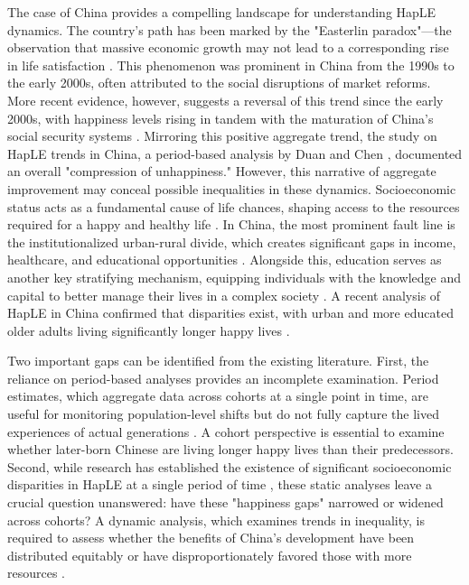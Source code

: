 \documentclass[12pt, a4paper]{article}
\begin{document}
The case of China provides a compelling landscape for understanding HapLE dynamics. The country's path has been marked by the "Easterlin paradox"—the observation that massive economic growth may not lead to a corresponding rise in life satisfaction \autocite{easterlin.1974.does}. This phenomenon was prominent in China from the 1990s to the early 2000s, often attributed to the social disruptions of market reforms\autocite{easterlin.2012.chinas,graham.2017.happiness,knight.2011.does}. More recent evidence, however, suggests a reversal of this trend since the early 2000s, with happiness levels rising in tandem with the maturation of China’s social security systems \autocite{cai.2023.does,wang.2023.hierarchical}. Mirroring this positive aggregate trend, the study on HapLE trends in China, a period-based analysis by Duan and Chen \autocite{duan.2020.happy}, documented an overall "compression of unhappiness." However, this narrative of aggregate improvement may conceal possible inequalities in these dynamics. Socioeconomic status acts as a fundamental cause of life chances, shaping access to the resources required for a happy and healthy life \autocite{link.1995.social}. In China, the most prominent fault line is the institutionalized urban-rural divide, which creates significant gaps in income, healthcare, and educational opportunities \autocite{guo.2024.regional,liu.2019.are}. Alongside this, education serves as another key stratifying mechanism, equipping individuals with the knowledge and capital to better manage their lives in a complex society \autocite{cheng.2021.sociodemographic}. A recent analysis of HapLE in China confirmed that disparities exist, with urban and more educated older adults living significantly longer happy lives \autocite{wan.2024.socioeconomic}.

Two important gaps can be identified from the existing literature. First, the reliance on period-based analyses provides an incomplete examination. Period estimates, which aggregate data across cohorts at a single point in time, are useful for monitoring population-level shifts but do not fully capture the lived experiences of actual generations \autocite{payne.2022.expansion}. A cohort perspective is essential to examine whether later-born Chinese are living longer happy lives than their predecessors. Second, while research has established the existence of significant socioeconomic disparities in HapLE at a single period of time \autocite{wan.2024.socioeconomic}, these static analyses leave a crucial question unanswered: have these "happiness gaps" narrowed or widened across cohorts? A dynamic analysis, which examines trends in inequality, is required to assess whether the benefits of China's development have been distributed equitably or have disproportionately favored those with more resources \autocite{liu.2019.are}.
\end{document}
